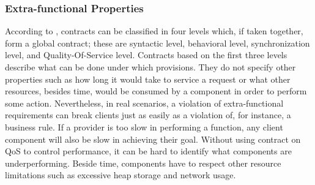 




\subsubsection{Extra-functional Properties} \label{sec:efp-resources}

According to \cite{Beugnard774917}, contracts can be classified in four levels which, if
taken together, form a global contract; these are syntactic level, behavioral level, synchronization level, and Quality-Of-Service level.
Contracts based on the first three levels describe what can be done under which provisions.
They do not specify other properties such as how long it would take to service a request or what other resources, besides time, would be consumed by a component in order to perform some action.
Nevertheless, in real scenarios, a violation of extra-functional
requirements can break clients just as easily as a violation of, for instance, a business rule. 
If a provider is too slow in performing a function, any client component will also be slow in achieving their goal.
Without using contract on QoS to control performance, it can be hard to identify what components are underperforming. 
Beside time, components have to respect other resource limitations such as excessive heap storage and network usage.


